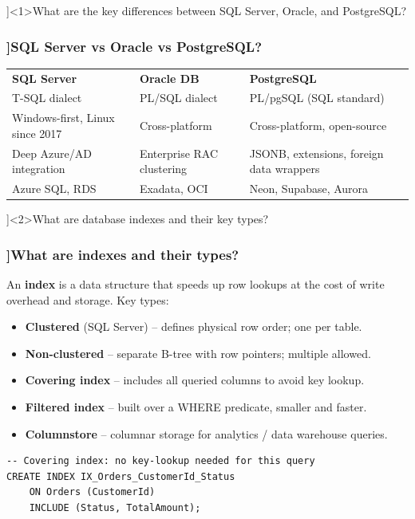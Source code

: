 
\QuestionSlide[\CategoryBadge[DbColor!20]{Databases}]<1>{What are the key differences between SQL Server, Oracle, and PostgreSQL?}

\begin{frame}[fragile]
  \frametitle{\AnswerTitle[\CategoryBadge[DbColor!20]{Databases}]{SQL Server vs Oracle vs PostgreSQL?}}

  {\footnotesize
  \begin{tabular}{p{2.8cm}p{2.8cm}p{2.8cm}}
    \textbf{SQL Server} & \textbf{Oracle DB} & \textbf{PostgreSQL} \\
    T-SQL dialect & PL/SQL dialect & PL/pgSQL (SQL standard) \\
    Windows-first, Linux since 2017 & Cross-platform & Cross-platform, open-source \\
    Deep Azure/AD integration & Enterprise RAC clustering & JSONB, extensions, foreign data wrappers \\
    Azure SQL, RDS & Exadata, OCI & Neon, Supabase, Aurora \\
  \end{tabular}
  }
\end{frame}

\QuestionSlide[\CategoryBadge[DbColor!20]{Databases}]<2>{What are database indexes and their key types?}

\begin{frame}[fragile]
  \frametitle{\AnswerTitle[\CategoryBadge[DbColor!20]{Databases}]{What are indexes and their types?}}

  {\footnotesize
  An \textbf{index} is a data structure that speeds up row lookups at the cost of write overhead and storage. Key types:
  \begin{itemize}
    \item \textbf{Clustered} (SQL Server) – defines physical row order; one per table.
    \item \textbf{Non-clustered} – separate B-tree with row pointers; multiple allowed.
    \item \textbf{Covering index} – includes all queried columns to avoid key lookup.
    \item \textbf{Filtered index} – built over a WHERE predicate, smaller and faster.
    \item \textbf{Columnstore} – columnar storage for analytics / data warehouse queries.
  \end{itemize}
  }

  \begin{verbatim}
-- Covering index: no key-lookup needed for this query
CREATE INDEX IX_Orders_CustomerId_Status
    ON Orders (CustomerId)
    INCLUDE (Status, TotalAmount);
  \end{verbatim}
\end{frame}

